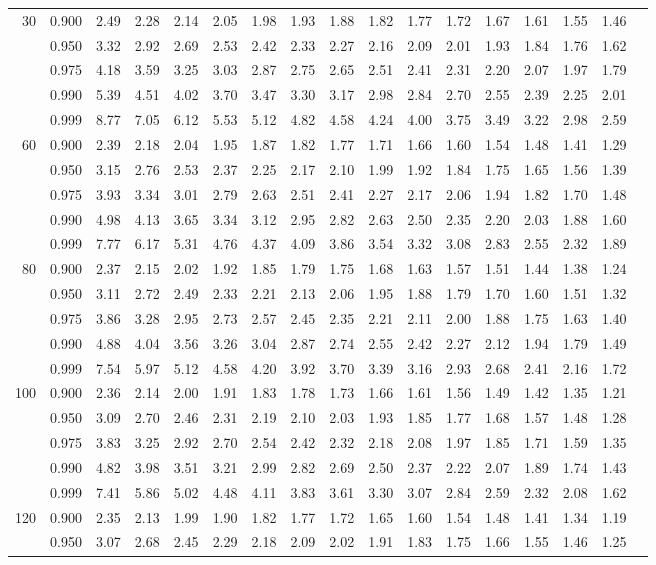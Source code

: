 {\begin{center}
\begin{tabular}{rrr@{\,}r@{\,}r@{\,}r@{\,}r@{\,}r@{\,}r@{\,}r
                   @{\,}r@{\,}r@{\,}r@{\,}r@{\,}r@{\,}r@{\,}r}
30&0.900&2.49&2.28&2.14&2.05&1.98&1.93&1.88&1.82&1.77&1.72&1.67&1.61&1.55&1.46\\
  &0.950&3.32&2.92&2.69&2.53&2.42&2.33&2.27&2.16&2.09&2.01&1.93&1.84&1.76&1.62\\
  &0.975&4.18&3.59&3.25&3.03&2.87&2.75&2.65&2.51&2.41&2.31&2.20&2.07&1.97&1.79\\
  &0.990&5.39&4.51&4.02&3.70&3.47&3.30&3.17&2.98&2.84&2.70&2.55&2.39&2.25&2.01\\
  &0.999&8.77&7.05&6.12&5.53&5.12&4.82&4.58&4.24&4.00&3.75&3.49&3.22&2.98&2.59\\
60&0.900&2.39&2.18&2.04&1.95&1.87&1.82&1.77&1.71&1.66&1.60&1.54&1.48&1.41&1.29\\
  &0.950&3.15&2.76&2.53&2.37&2.25&2.17&2.10&1.99&1.92&1.84&1.75&1.65&1.56&1.39\\
  &0.975&3.93&3.34&3.01&2.79&2.63&2.51&2.41&2.27&2.17&2.06&1.94&1.82&1.70&1.48\\
  &0.990&4.98&4.13&3.65&3.34&3.12&2.95&2.82&2.63&2.50&2.35&2.20&2.03&1.88&1.60\\
  &0.999&7.77&6.17&5.31&4.76&4.37&4.09&3.86&3.54&3.32&3.08&2.83&2.55&2.32&1.89\\
80&0.900&2.37&2.15&2.02&1.92&1.85&1.79&1.75&1.68&1.63&1.57&1.51&1.44&1.38&1.24\\
  &0.950&3.11&2.72&2.49&2.33&2.21&2.13&2.06&1.95&1.88&1.79&1.70&1.60&1.51&1.32\\
  &0.975&3.86&3.28&2.95&2.73&2.57&2.45&2.35&2.21&2.11&2.00&1.88&1.75&1.63&1.40\\
  &0.990&4.88&4.04&3.56&3.26&3.04&2.87&2.74&2.55&2.42&2.27&2.12&1.94&1.79&1.49\\
  &0.999&7.54&5.97&5.12&4.58&4.20&3.92&3.70&3.39&3.16&2.93&2.68&2.41&2.16&1.72\\
100
  &0.900&2.36&2.14&2.00&1.91&1.83&1.78&1.73&1.66&1.61&1.56&1.49&1.42&1.35&1.21\\
  &0.950&3.09&2.70&2.46&2.31&2.19&2.10&2.03&1.93&1.85&1.77&1.68&1.57&1.48&1.28\\
  &0.975&3.83&3.25&2.92&2.70&2.54&2.42&2.32&2.18&2.08&1.97&1.85&1.71&1.59&1.35\\
  &0.990&4.82&3.98&3.51&3.21&2.99&2.82&2.69&2.50&2.37&2.22&2.07&1.89&1.74&1.43\\
  &0.999&7.41&5.86&5.02&4.48&4.11&3.83&3.61&3.30&3.07&2.84&2.59&2.32&2.08&1.62\\
120
  &0.900&2.35&2.13&1.99&1.90&1.82&1.77&1.72&1.65&1.60&1.54&1.48&1.41&1.34&1.19\\
  &0.950&3.07&2.68&2.45&2.29&2.18&2.09&2.02&1.91&1.83&1.75&1.66&1.55&1.46&1.25\\

\end{tabular}
\end{center}}
